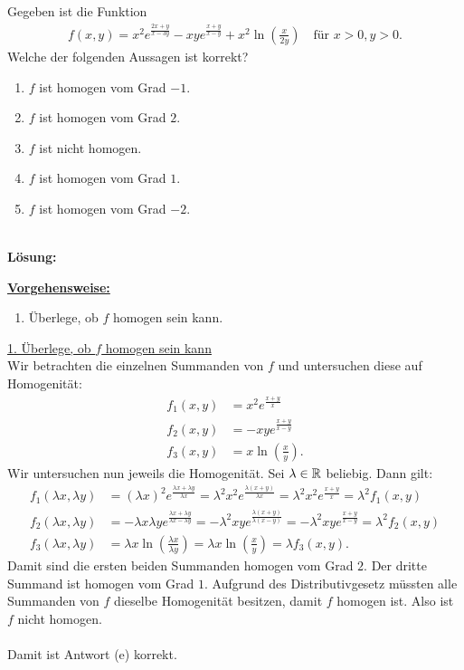 \subsection*{}
Gegeben ist die Funktion
\begin{align*}
	f(x,y) 
	=
	x^2 e^{\frac{ 2x+y}{x - 3y }}
	-
	xy e^{\frac{x+y}{x-y}}
	+
	x^2 \ln \left( \frac{x }{2y} \right)
	\quad \textrm{für } x>0,y>0.
\end{align*}
Welche der folgenden Aussagen ist korrekt?
\renewcommand{\labelenumi}{(\alph{enumi})}
\begin{enumerate}
	\item
	$ f  $ ist homogen vom Grad $ -1 $.
	\item
	$ f  $ ist homogen vom Grad $ 2 $.
	\item
	$f $ ist nicht homogen.
	\item 
	$ f  $ ist homogen vom Grad $ 1$.
	\item
	$ f  $ ist homogen vom Grad $ -2 $.
\end{enumerate}\ \\
\textbf{Lösung:}
\begin{mdframed}
\underline{\textbf{Vorgehensweise:}}
\renewcommand{\labelenumi}{\theenumi.}
\begin{enumerate}
\item Überlege, ob $ f $ homogen sein kann.
\end{enumerate}
\end{mdframed}

\underline{1. Überlege, ob $ f $ homogen sein kann}\\
Wir betrachten die einzelnen Summanden von $ f $ und untersuchen diese auf Homogenität:
\begin{align*}
	f_1(x,y)
	&=
	x^2 e^{\frac{x+y}{x}}\\
	f_2(x,y)
	&=
	-
	xy e^{\frac{x+y}{x-y}}\\
	f_3(x,y)
	&=
	x \ln \left( \frac{x}{y} \right).
\end{align*} 
Wir untersuchen nun jeweils die Homogenität.
Sei $ \lambda \in \mathbb{R} $ beliebig. Dann gilt:
\begin{align*}
	f_1(\lambda x, \lambda y)
	&=
	(\lambda x)^2 e^{\frac{\lambda x+ \lambda y} { \lambda x}}
	=
	\lambda^2 x^2 e^{\frac{\lambda( x+  y) } { \lambda x}}
	=
	\lambda^2 x^2 e^{\frac{x+y}{x}} 
	= \lambda^2 f_1(x,y)
	\\
	f_2(\lambda x, \lambda y)
	&=
	-
	\lambda x \lambda y e^{\frac{\lambda x+ \lambda y}{ \lambda x- \lambda y}}
	=
	-
	\lambda^2 xy e^{\frac{\lambda (x+  y)}{ \lambda (x-  y)}}
	=
	-
	\lambda^2 xy e^{\frac{x+  y}{  x-  y}}
	=
	\lambda^2 f_2(x,y)\\
	f_3(\lambda x, \lambda y)
	&=
	\lambda x \ln \left( \frac{\lambda x}{ \lambda y} \right)
	=
	\lambda x \ln \left( \frac{ x}{ y} \right)
	=
	\lambda f_3(x,y).
\end{align*}
Damit sind die ersten beiden Summanden homogen vom Grad $ 2 $.
Der dritte Summand ist homogen vom Grad $ 1 $. Aufgrund des Distributivgesetz müssten alle Summanden von $ f $ dieselbe Homogenität besitzen, damit $ f $ homogen ist. Also ist $ f $ nicht homogen.\\
\\
Damit ist Antwort (e) korrekt.


